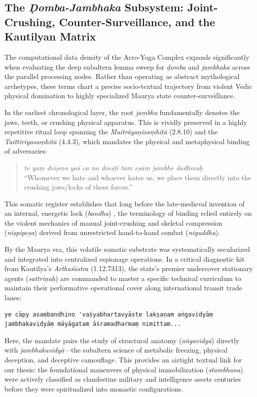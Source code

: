 \documentclass[11pt,letterpaper]{article}
\begin{document}
\subsection{The \textit{Ḍomba-Jambhaka} Subsystem: Joint-Crushing, Counter-Surveillance, and the Kautilyan Matrix}

The computational data density of the Acro-Yoga Complex expands significantly when evaluating the deep subaltern lemma sweep for \textit{ḍomba} and \textit{jambhaka} across the parallel processing nodes. Rather than operating as abstract mythological archetypes, these terms chart a precise socio-textual trajectory from violent Vedic physical domination to highly specialized Maurya state counter-surveillance.

In the earliest chronological layer, the root \textit{jambha} fundamentally denotes the jaws, teeth, or crushing physical apparatus. This is vividly preserved in a highly repetitive ritual loop spanning the \textit{Maitrāyaṇīsaṃhitā} (2.8.10) and the \textit{Taittirīyasaṃhitā} (4.4.3), which mandates the physical and metaphysical binding of adversaries:
\begin{quote}
    \textit{te yaṃ dviṣmo yaś ca no dveṣṭi tam eṣāṃ jambhe dadhmaḥ} \cite{MS_2_8} \\
    ``Whomever we hate and whoever hates us, we place them directly into the crushing jaws/locks of these forces.'' \cite{MS_2_8}
\end{quote}
This somatic register establishes that long before the late-medieval invention of an internal, energetic lock (\textit{bandha}) \cite{GherS}, the terminology of binding relied entirely on the violent mechanics of manual joint-crushing and skeletal compression (\textit{niṣpipeṣa}) derived from unrestricted hand-to-hand combat (\textit{niyuddha}).

By the Maurya era, this volatile somatic substrate was systematically secularized and integrated into centralized espionage operations. In a critical diagnostic hit from Kautilya's \textit{Arthaśāstra} (1.12.7313), the state's premier undercover stationary agents (\textit{sattriṇaḥ}) are commanded to master a specific technical curriculum to maintain their performative operational cover along international transit trade lanes:
\begin{lstlisting}[language=Sanskrit, caption={Arthaśāstra Espionage Curriculum Configuration}, label={list:arthashastra}]
ye cāpy asaṃbandhino 'vaśyabhartavyāste lakṣaṇam aṅgavidyāṃ
jambhakavidyāṃ māyāgatam āśramadharmaṃ nimittam...
\end{lstlisting}
Here, the mandate pairs the study of structural anatomy (\textit{aṅgavidyā}) directly with \textit{jambhakavidyā}---the subaltern science of metabolic freezing, physical deception, and deceptive camouflage. This provides an airtight textual link for our thesis: the foundational maneuvers of physical immobilization (\textit{stambhana}) were actively classified as clandestine military and intelligence assets centuries before they were spiritualized into monastic configurations.
\end{document}
